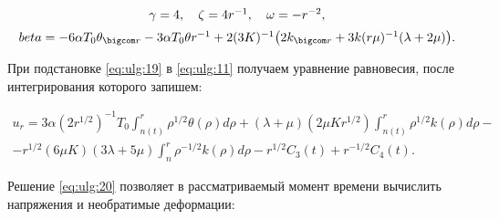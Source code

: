 \begin{equation} 

\label{eq:ulg:19} 

\begin{array}{c} 

\gamma =4, \quad  \zeta =4r^{-1} , \quad \omega =-r^{-2} ,  

\\[2mm]

beta =-6\alpha T_{0}\theta_{\bigcom r} -

3\alpha T_{0}\theta r^{-1} +2(3K)^{-1} \bigl(2k_{\bigcom r} +3k(r\mu )^{-1} (\lambda +2\mu )\bigr).

\end{array} 

\end{equation} 



При подстановке \eqref{eq:ulg:19} в \eqref{eq:ulg:11} получаем уравнение равновесия, после интегрирования которого запишем:

\begin{multline} \label{eq:ulg:20} 

u_{r} =3\alpha (2r^{1/2} )^{-1} T_{0} 

\int _{n(t)}^{r} \rho ^{1/2} \theta (\rho )d\rho  

+(\lambda +\mu )(2\mu Kr^{1/2} )

\int _{n(t)}^{r}\rho ^{1/2} k(\rho )d\rho  - 

\\ 

-r^{1/2} (6\mu K)(3\lambda +5\mu )

\int _{n}^{r}\rho ^{-1/2} k(\rho )d\rho  -r^{1/2} C_{3} (t)+r^{-1/2} C_{4} (t).

\end{multline}  



Решение \eqref{eq:ulg:20} позволяет в рассматриваемый момент времени вычислить напряжения и необратимые деформации:


